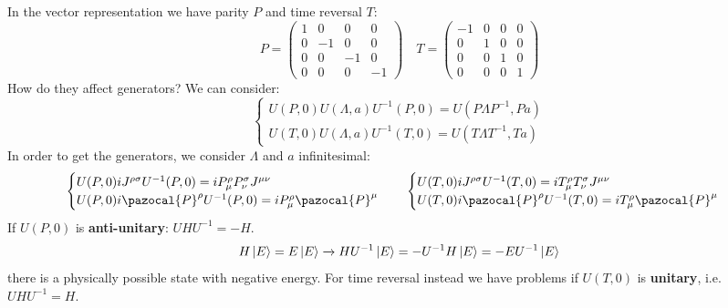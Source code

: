 \documentclass[../main.tex]{subfiles}
\begin{document}
In the vector representation we have parity $P$ and time reversal $T$:
\[
P=\left(\begin{array}{cccc}
    1 & 0 & 0 & 0 \\
    0 & -1 & 0 & 0 \\
    0 & 0 & -1 & 0 \\
    0 & 0 & 0 & -1
\end{array}\right)
\quad
T=\left(\begin{array}{cccc}
    -1 & 0 & 0 & 0 \\
    0 & 1 & 0 & 0 \\
    0 & 0 & 1 & 0 \\
    0 & 0 & 0 & 1
\end{array}\right)
\]
How do they affect generators? We can consider:
\[
\begin{cases}
U(P,0)U(\Lambda,a)U^{-1}(P,0)=U(P\Lambda P^{-1},Pa)\\
U(T,0)U(\Lambda,a)U^{-1}(T,0)=U(T\Lambda T^{-1},Ta)
\end{cases}
\]
In order to get the generators, we consider $\Lambda$ and $a$ infinitesimal:
\[
\begin{cases}
U(P,0)iJ^{\rho\sigma}U^{-1}(P,0)=iP^{\rho}_{\mu}P^{\sigma}_{\nu}J^{\mu\nu}\\
U(P,0)i\pazocal{P}^{\rho}U^{-1}(P,0)=iP^{\rho}_{\mu}\pazocal{P}^{\mu}
\end{cases}
\quad
\begin{cases}
U(T,0)iJ^{\rho\sigma}U^{-1}(T,0)=iT^{\rho}_{\mu}T^{\sigma}_{\nu}J^{\mu\nu}\\
U(T,0)i\pazocal{P}^{\rho}U^{-1}(T,0)=iT^{\rho}_{\mu}\pazocal{P}^{\mu}
\end{cases}
\]
If $U(P,0)$ is \textbf{anti-unitary}: $UHU^{-1}=-H$.
\[
H\ket{E}=E\ket{E}\xrightarrow[]{}HU^{-1}\ket{E}=-U^{-1}H\ket{E}=-EU^{-1}\ket{E}
\]
there is a physically possible state with negative energy. For time reversal instead we have problems if $U(T,0)$ is \textbf{unitary}, i.e. $UHU^{-1}=H$.
\end{document}
